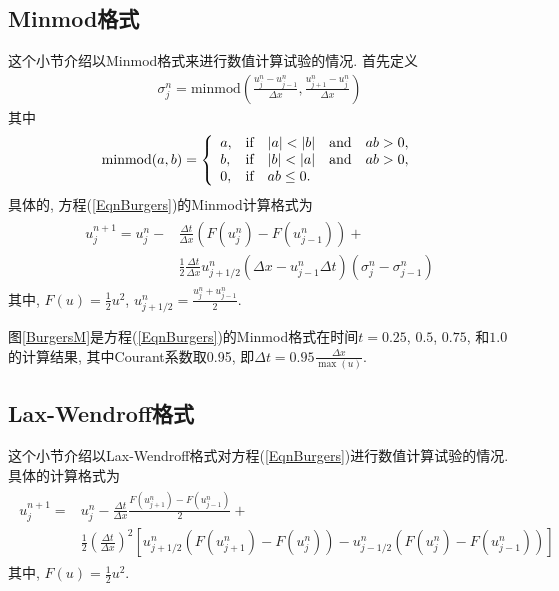 \documentclass[10.5pt
]{article}
\begin{document}
\subsection{Minmod格式}
这个小节介绍以Minmod格式来进行数值计算试验的情况. 首先定义\citep{Zheng2019}
\begin{align}
\sigma^n_j=\text{minmod}(\frac{u^n_j-u^n_{j-1}}{\Delta x}, \frac{u^n_{j+1}-u^n_{j}}{\Delta x})
\end{align}
其中
\begin{align}
\text{minmod}(a, b) = \left\{\begin{array}{ll} a, & \text{if\quad} |a|<|b| \text{\quad and\quad} ab>0,
\\
b, & \text{if\quad} |b|<|a| \text{\quad and\quad} ab>0,
\\
0, & \text{if\quad} ab\le 0.
\end{array} \right.
\end{align}
具体的, 方程(\ref{EqnBurgers})的Minmod计算格式为
\begin{align}
\begin{aligned}
u^{n+1}_j=u^{n}_j-&\frac{\Delta t}{\Delta x}(F(u^n_j)-F(u^n_{j-1}))+\\
&\frac{1}{2}\frac{\Delta t}{\Delta x}u^n_{j+1/2}(\Delta x-u^n_{j-1}\Delta t)(\sigma^n_j-\sigma^n_{j-1})
\end{aligned}	\label{minmod}
\end{align}
其中, $F(u)=\frac{1}{2}u^2$, $u^n_{j+1/2}=\frac{u^n_{j}+u^n_{j-1}}{2}$.

图\ref{BurgersM}是方程(\ref{EqnBurgers})的Minmod格式在时间$t = 0.25$, $0.5$, $0.75$, 和$1.0$的计算结果, 其中Courant系数取0.95, 即$\Delta t = 0.95 \frac{\Delta x}{\max(u)}$.
\subsection{Lax-Wendroff格式}
这个小节介绍以Lax-Wendroff格式对方程(\ref{EqnBurgers})进行数值计算试验的情况. 具体的计算格式为
\begin{align}
\begin{aligned}
u^{n+1}_j=&u^{n}_j-\frac{\Delta t}{\Delta x}\frac{F(u^n_{j+1})-F(u^n_{j-1})}{2}+\\
&\frac{1}{2}(\frac{\Delta t}{\Delta x})^2[u^n_{j+1/2}(F(u^n_{j+1})-F(u^n_j))-u^n_{j-1/2}(F(u^n_j)-F(u^n_{j-1}))]
\end{aligned}
\end{align}
其中, $F(u)=\frac{1}{2}u^2$.
\end{document}
